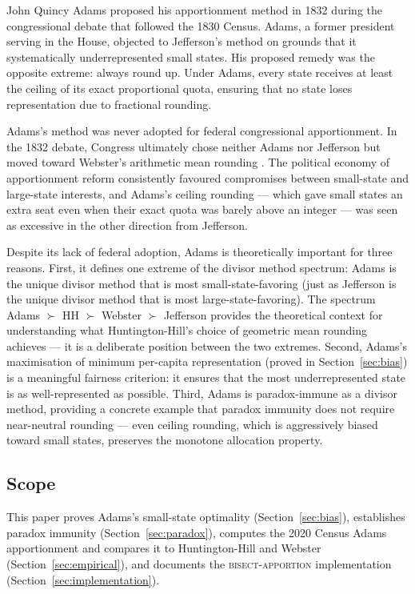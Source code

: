 John Quincy Adams proposed his apportionment method in 1832 during
the congressional debate that followed the 1830 Census.
Adams, a former president serving in the House, objected to Jefferson's
method on grounds that it systematically underrepresented small states.
His proposed remedy was the opposite extreme: always round up.
Under Adams, every state receives at least the ceiling of its
exact proportional quota, ensuring that no state loses representation
due to fractional rounding.

Adams's method was never adopted for federal congressional apportionment.
In the 1832 debate, Congress ultimately chose neither Adams nor Jefferson
but moved toward Webster's arithmetic mean rounding \citep{balinski1982fair}.
The political economy of apportionment reform consistently favoured
compromises between small-state and large-state interests,
and Adams's ceiling rounding --- which gave small states an extra seat
even when their exact quota was barely above an integer ---
was seen as excessive in the other direction from Jefferson.

Despite its lack of federal adoption, Adams is theoretically important
for three reasons.
First, it defines one extreme of the divisor method spectrum:
Adams is the unique divisor method that is most small-state-favoring
(just as Jefferson is the unique divisor method that is most
large-state-favoring).
The spectrum Adams $\succ$ HH $\succ$ Webster $\succ$ Jefferson
provides the theoretical context for understanding what Huntington-Hill's
choice of geometric mean rounding achieves --- it is a deliberate
position between the two extremes.
Second, Adams's maximisation of minimum per-capita representation
(proved in Section~\ref{sec:bias}) is a meaningful fairness criterion:
it ensures that the most underrepresented state is as well-represented
as possible.
Third, Adams is paradox-immune as a divisor method, providing a concrete
example that paradox immunity does not require near-neutral rounding ---
even ceiling rounding, which is aggressively biased toward small states,
preserves the monotone allocation property.

\subsection{Scope}

This paper proves Adams's small-state optimality (Section~\ref{sec:bias}),
establishes paradox immunity (Section~\ref{sec:paradox}),
computes the 2020 Census Adams apportionment and compares it to
Huntington-Hill and Webster (Section~\ref{sec:empirical}),
and documents the \textsc{bisect-apportion} implementation
(Section~\ref{sec:implementation}).
